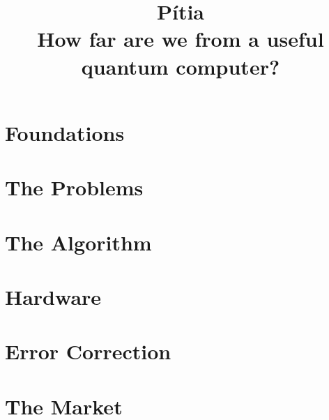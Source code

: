 \documentclass[11pt,oneside]{book}
\title{Pítia\\[0.5em]\large How far are we from a useful quantum computer?}
\author{}
\date{}
\begin{document}
\frontmatter
\maketitle
\tableofcontents


\mainmatter

\part{Foundations}\label{part:foundations}









\part{The Problems}\label{part:problems}


\part{The Algorithm}\label{part:algorithm}



\part{Hardware}\label{part:hardware}



\part{Error Correction}\label{part:qec}


\part{The Market}\label{part:market}
\end{document}

